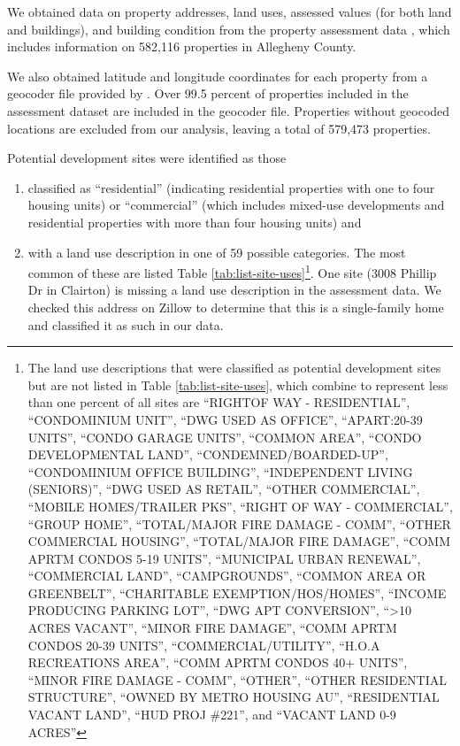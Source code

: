 \documentclass[
]{book}
\providecommand{\tightlist}{%
  \setlength{\itemsep}{0pt}\setlength{\parskip}{0pt}}
\theoremstyle{definition}
\theoremstyle{definition}
\theoremstyle{definition}
\theoremstyle{definition}
\theoremstyle{remark}
\begin{document}
We obtained data on property addresses, land uses, assessed values (for both
land and buildings), and building condition from the property assessment data
\citep{allegheny_county_office_of_property_assessments_allegheny_2022}, which
includes information on 582,116 properties in Allegheny County.

We also obtained latitude and longitude coordinates for each property from a
geocoder file provided by \citet{western_pennsylvania_regional_data_center_geocoders_2021}.
Over 99.5 percent of properties included in the assessment dataset are included
in the geocoder file. Properties without geocoded locations are excluded from
our analysis, leaving a total of 579,473 properties.

Potential development sites were identified as those

\begin{enumerate}
\def\labelenumi{\arabic{enumi}.}
\tightlist
\item
  classified as ``residential''
  (indicating residential properties with one to four housing units) or ``commercial''
  (which includes mixed-use developments and residential properties with more than four
  housing units) and
\item
  with a land use description in one of 59 possible categories. The most common of
  these are listed Table \ref{tab:list-site-uses}\footnote{The land use descriptions that were
    classified as potential development sites but are not listed in Table
    \ref{tab:list-site-uses}, which combine to represent less than one percent of all sites
    are ``RIGHTOF WAY - RESIDENTIAL'', ``CONDOMINIUM UNIT'', ``DWG USED AS OFFICE'', ``APART:20-39
    UNITS'', ``CONDO GARAGE UNITS'', ``COMMON AREA'', ``CONDO DEVELOPMENTAL LAND'',
    ``CONDEMNED/BOARDED-UP'', ``CONDOMINIUM OFFICE BUILDING'', ``INDEPENDENT LIVING (SENIORS)'',
    ``DWG USED AS RETAIL'', ``OTHER COMMERCIAL'', ``MOBILE HOMES/TRAILER PKS'', ``RIGHT OF WAY -
    COMMERCIAL'', ``GROUP HOME'', ``TOTAL/MAJOR FIRE DAMAGE - COMM'', ``OTHER COMMERCIAL HOUSING'',
    ``TOTAL/MAJOR FIRE DAMAGE'', ``COMM APRTM CONDOS 5-19 UNITS'', ``MUNICIPAL URBAN RENEWAL'',
    ``COMMERCIAL LAND'', ``CAMPGROUNDS'', ``COMMON AREA OR GREENBELT'', ``CHARITABLE
    EXEMPTION/HOS/HOMES'', ``INCOME PRODUCING PARKING LOT'', ``DWG APT CONVERSION'', ``\textgreater10 ACRES
    VACANT'', ``MINOR FIRE DAMAGE'', ``COMM APRTM CONDOS 20-39 UNITS'', ``COMMERCIAL/UTILITY'',
    ``H.O.A RECREATIONS AREA'', ``COMM APRTM CONDOS 40+ UNITS'', ``MINOR FIRE DAMAGE - COMM'',
    ``OTHER'', ``OTHER RESIDENTIAL STRUCTURE'', ``OWNED BY METRO HOUSING AU'', ``RESIDENTIAL VACANT
    LAND'', ``HUD PROJ \#221'', and ``VACANT LAND 0-9 ACRES''}. One site (3008 Phillip Dr in Clairton) is missing a land use description in the assessment data. We checked this address on Zillow to determine that this is a single-family home and classified it as such in our data.
\end{enumerate}
\end{document}
